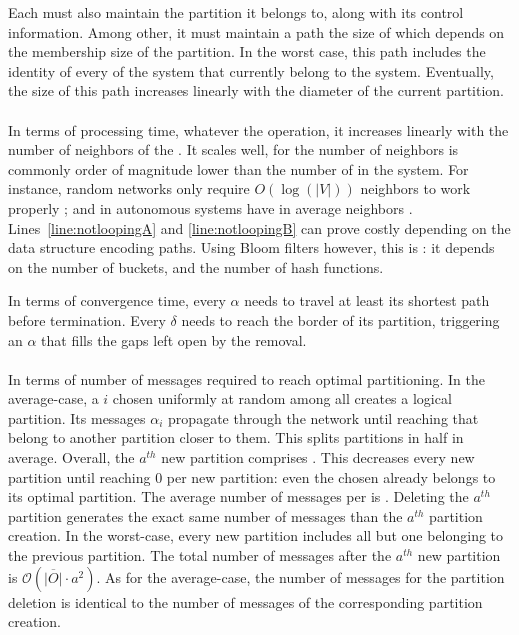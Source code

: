 \noindent Each \process must also maintain the partition it belongs to,
along with its control information. Among other, it must maintain a
path the size of which depends on the membership size of the
partition. In the worst case, this path includes the identity of every
\process of the system that currently belong to the system. Eventually,
the size of this path increases linearly with the diameter of the
current partition. 

\paragraph{}
In terms of processing time, whatever the operation, it increases
linearly with the number of neighbors of the \process. It scales well,
for the number of neighbors is commonly order of magnitude lower than
the number of \processes in the system. For instance, random networks
only require $O(\log(|V|))$ neighbors to work properly \REF; and
\processes in autonomous systems have in average  neighbors
\REF. Lines~\ref{line:notloopingA} and \ref{line:notloopingB} can
prove costly depending on the data structure encoding paths. Using
Bloom filters however, this is : it depends on the
number of buckets, and the number of hash functions.

\noindent In terms of convergence time, every $\alpha$ needs to travel
at least its shortest path before termination. Every $\delta$ needs to
reach the border of its partition, triggering an $\alpha$ that fills
the gaps left open by the removal. 

\paragraph{}
In terms of number of messages required to reach optimal
partitioning. In the average-case, a \process $i$ chosen uniformly at
random among all \processes creates a logical partition. Its messages
$\alpha_i$ propagate through the network until reaching \processes that
belong to another partition closer to them. This splits partitions in
half in average. Overall, the $a^{th}$ new partition comprises
\processes. This decreases every new partition until reaching $0$
\processes per new partition: even the chosen \process already belongs
to its optimal partition. The average number of messages per \process
is .  Deleting the
$a^{th}$ partition generates the exact same number of messages than
the $a^{th}$ partition creation.  In the
worst-case, every new partition includes all but one \process belonging
to the previous partition. The total number of messages after the
$a^{th}$ new partition is $\mathcal{O}(\overline{|O|}\cdot a^2)$. As
for the average-case, the number of messages for the partition
deletion is identical to the number of messages of the corresponding
partition creation.

\noindent {}


